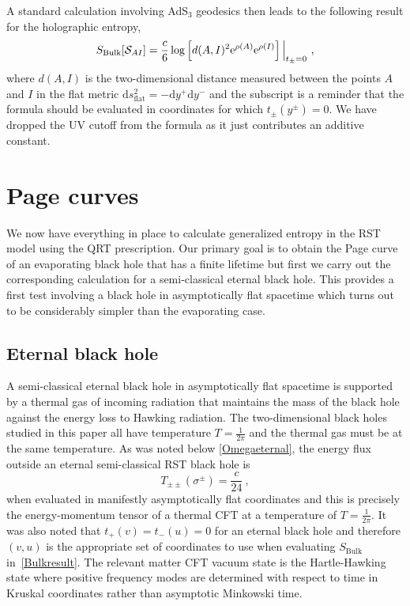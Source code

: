 \documentclass[12pt,a4paper]{article}
\newcommand{\dd}{\mathrm{d}}
\newcommand{\e}{\mathrm{e}}
\newcommand{\be}{\begin{equation}}
\newcommand{\ee}{\end{equation}}
\newcommand{\f}[2]{\frac{#1}{#2}}
\begin{document}
A standard calculation involving AdS$_3$ geodesics then leads to the following result for the holographic entropy,
\be\label{Bulkresult}
S_\text{Bulk}[{\cal S}_{AI}] = \f{c}{6}\log \left[ d(A,I)^2 \e^{\rho(A)}\e^{\rho(I)}\right]\Big|_{t_\pm =0}~,
\ee
where $d(A,I)$ is the two-dimensional distance measured between the points $A$ and $I$ in the flat metric 
$\dd s^2_\text{flat} = -\dd y^+\dd y^-$ and the subscript is a reminder that the formula should be evaluated in coordinates 
for which $t_\pm(y^\pm)=0$. We have dropped the UV cutoff from the formula as it just contributes an additive constant. 


\section{Page curves}\label{sec:pages}

We now have everything in place to calculate generalized entropy in the RST model using the QRT prescription.
Our primary goal is to obtain the Page curve of an evaporating black hole that has a finite lifetime but first we 
carry out the corresponding calculation for a semi-classical eternal black hole. This provides a first test involving a black hole
in asymptotically flat spacetime which turns out to be considerably simpler than the evaporating case.

\subsection{Eternal black hole}\label{sec:eternal}

A semi-classical eternal black hole in asymptotically flat spacetime is supported by a thermal gas of incoming radiation that maintains the mass of the black hole against the energy loss to Hawking radiation. The two-dimensional black holes studied in this paper all have  temperature $T=\f{1}{2\pi}$ and the thermal gas must be at the same temperature. As was noted below \eqref{Omegaeternal}, the energy flux outside an eternal semi-classical RST black hole is 
\be
T_{\pm\pm}(\sigma^\pm) = \f{c}{24}~,
\ee
when evaluated in manifestly asymptotically flat coordinates and
this is precisely the energy-momentum tensor of a thermal CFT at a temperature of $T=\f{1}{2\pi}$.
It was also noted that $t_+(v)=t_-(u)=0$ for an eternal black hole and therefore $(v,u)$ is the appropriate set of coordinates to use when evaluating $S_\text{Bulk}$ in~\eqref{Bulkresult}. The relevant matter CFT vacuum state is the Hartle-Hawking state where positive frequency modes are determined with respect to time in Kruskal coordinates rather than asymptotic Minkowski time. 
\end{document}

